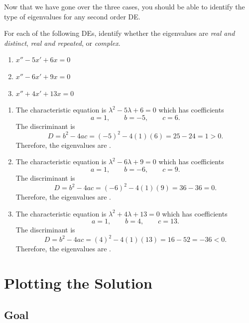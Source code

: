 \documentclass[10pt,letterpaper]{article}
\begin{document}
Now that we have gone over the three cases, you should be able to identify the type of eigenvalues for any second order DE.

\begin{example}[2]{
For each of the following DEs, identify whether the eigenvalues are
\textit{real and distinct}, \textit{real and repeated}, or \textit{complex}.\\
\begin{enumerate}
    \item[a)] $x''-5x'+6x=0$
    \item[b)] $x''-6x'+9x=0$
    \item[c)] $x''+4x'+13x=0$
\end{enumerate}
}

\begin{enumerate}
    \item[a)] The characteristic equation is  $\lambda^2-5\lambda+6=0$ which has coefficients
    \[
    a=1,\qquad b=-5,\qquad c=6.
    \]
    The discriminant is
    \[
    D=b^2-4ac
    =(-5)^2-4(1)(6)
    =25-24
    =1>0.
    \]
    Therefore, the eigenvalues are .\\

    \item[b)] The characteristic equation is $\lambda^2-6\lambda+9=0$ which has coefficients
    \[
    a=1,\qquad b=-6,\qquad c=9.
    \]
    The discriminant is
    \[
    D=b^2-4ac
    =(-6)^2-4(1)(9)
    =36-36
    =0.
    \]
    Therefore, the eigenvalues are .\\

    \item[c)] The characteristic equation is $\lambda^2+4\lambda+13=0$ which has coefficients
    \[
    a=1,\qquad b=4,\qquad c=13.
    \]
    The discriminant is
    \[
    D=b^2-4ac
    =(4)^2-4(1)(13)
    =16-52
    =-36<0.
    \]
    Therefore, the eigenvalues are .
\end{enumerate}

\end{example}


\section{Plotting the Solution}

\subsection{Goal}
\end{document}
